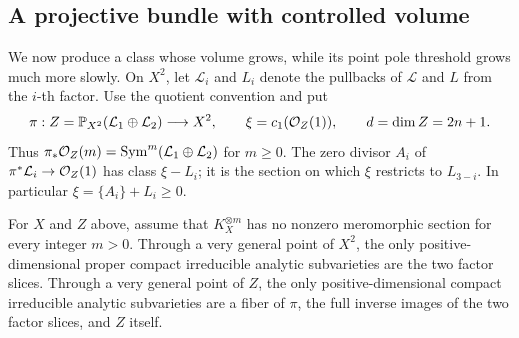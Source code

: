 \subsection{A projective bundle with controlled volume}

We now produce a class whose volume grows, while its point pole threshold
grows much more slowly.  On \(X^2\), let \(\mathscr L_i\) and \(L_i\)
denote the pullbacks of \(\mathscr L\) and \(L\) from the \(i\)-th factor.
Use the quotient convention and put
\[
 \pi:Z=\mathbb P_{X^2}(\mathcal{L}_1\oplus\mathcal{L}_2)\longrightarrow X^2,
 \qquad \xi=c_1(\mathcal O_Z(1)),\qquad d=\dim Z=2n+1 .
\]
Thus \(\pi_*\mathcal O_Z(m)=\operatorname{Sym}^m(\mathcal{L}_1\oplus\mathcal{L}_2)\) for
\(m\ge0\).  The zero divisor \(A_i\) of
\(\pi^*\mathcal{L}_i\to\mathcal O_Z(1)\) has class \(\xi-L_i\); it is the
section on which \(\xi\) restricts to \(L_{3-i}\).  In particular
\(\xi=\{A_i\}+L_i\ge0\).

\begin{lemma}\label{nv:subvarieties}
For \(X\) and \(Z\) above, assume that \(K_X^{\otimes m}\) has no nonzero
meromorphic section for every integer \(m>0\).
Through a very general point of \(X^2\), the only positive-dimensional
proper compact irreducible analytic subvarieties are the two factor
slices.  Through a very general point of \(Z\), the only
positive-dimensional compact irreducible analytic subvarieties are a
fiber of \(\pi\), the full inverse images of the two factor slices, and
\(Z\) itself.
\end{lemma}

